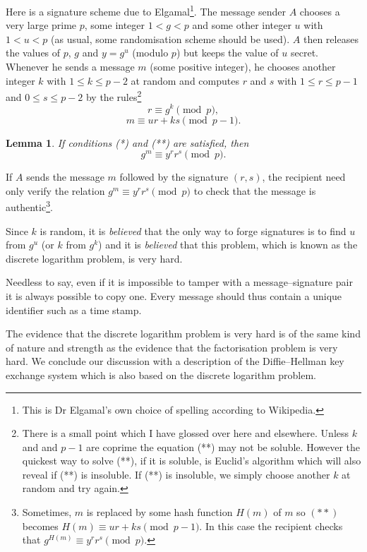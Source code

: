 \documentclass[12pt,a4paper]{article}
\theoremstyle{plain}
\newtheorem{lemma}[theorem]{Lemma}
\theoremstyle{definition}
\begin{document}
Here is a signature  scheme due to 
Elgamal\footnote{This 
is Dr Elgamal's own choice of spelling 
according to Wikipedia.}\label{P;Elgamal}.
The message sender $A$ chooses a very large
prime $p$, some integer $1<g<p$
and some other integer $u$ with $1<u<p$
(as usual, some randomisation scheme should be used).
$A$ then releases the values of $p$, $g$
and $y=g^{u}$ (modulo $p$) but keeps the
value of $u$ secret. Whenever he sends
a message $m$ (some positive integer),
he chooses another integer $k$
with $1\leq k\leq p-2$ at random
and computes
$r$ and $s$ with $1\leq r\leq p-1$
and $0\leq s\leq p-2$
by the rules\footnote{There is
a small point which
I have glossed over here and elsewhere.
Unless $k$ and and $p-1$ are coprime
the equation (**) may not be soluble.
However the quickest way to solve (**),
if it is soluble, is Euclid's algorithm
which will also reveal if (**) is
insoluble. If (**) is insoluble, we simply
choose another $k$ at random and try
again.}
\begin{equation*}
r\equiv g^{k} \pmod{p},\tag*{(*)}
\end{equation*}
\begin{equation*}
m\equiv ur+ks \pmod{p-1}.\tag*{(**)}
\end{equation*}
\begin{lemma} If conditions (*) and (**) are satisfied,
then
\[g^{m}\equiv y^{r}r^{s}\pmod{p}.\]
\end{lemma}
\noindent
If $A$ sends the message $m$ followed by the signature $(r,s)$,
the recipient need only verify the relation
$g^{m}\equiv y^{r}r^{s}\pmod{p}$ to check
that the message is authentic\footnote{Sometimes,
$m$ is replaced by some hash function $H(m)$ of $m$
so $(**)$ becomes $H(m)\equiv ur+ks \pmod{p-1}$.
In this case the recipient
checks that $g^{H(m)}\equiv y^{r}r^{s}\pmod{p}$.}.

Since $k$ is random, it is \emph{believed} that the
only way to forge signatures is to find $u$
from $g^{u}$ (or $k$ from $g^{k}$) and it is \emph{believed}
that this problem, which is known as
the discrete logarithm problem, is very
hard.

Needless to say, even if it is impossible to
tamper with a message--signature pair it is always
possible to copy one. Every message should thus
contain a unique identifier such as a time stamp.

The evidence that the  discrete logarithm problem is very
hard is of the same kind of nature and strength
as the evidence that the factorisation problem
is very hard. We conclude our discussion with
a description of the Diffie--Hellman key exchange
system which is also based on the discrete logarithm problem.
\end{document}
